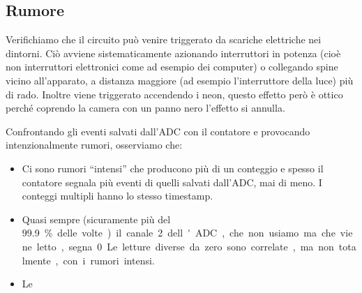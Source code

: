 \subsection{Rumore}

Verifichiamo che il circuito può venire triggerato da scariche elettriche nei dintorni.
Ciò avviene sistematicamente azionando interruttori in potenza
(cioè non interruttori elettronici come ad esempio dei computer)
o collegando spine vicino all'apparato,
a distanza maggiore (ad esempio l'interruttore della luce) più di rado.
Inoltre viene triggerato accendendo i neon,
questo effetto però è ottico perché coprendo la camera con un panno nero l'effetto si annulla.

Confrontando gli eventi salvati dall'ADC con il contatore
e provocando intenzionalmente rumori, osserviamo che:
\begin{itemize}
	\item
	Ci sono rumori ``intensi'' che producono più di un conteggio
	e spesso il contatore segnala più eventi di quelli salvati dall'ADC, mai di meno.
	I conteggi multipli hanno lo stesso timestamp.
	\item
	Quasi sempre (sicuramente più del \SI{99.9}\percent delle volte)
	il canale 2 dell'ADC, che non usiamo ma che viene letto, segna 0.
	Le letture diverse da zero sono correlate, ma non totalmente, con i rumori intensi.
	\item
	Le 
\end{itemize}